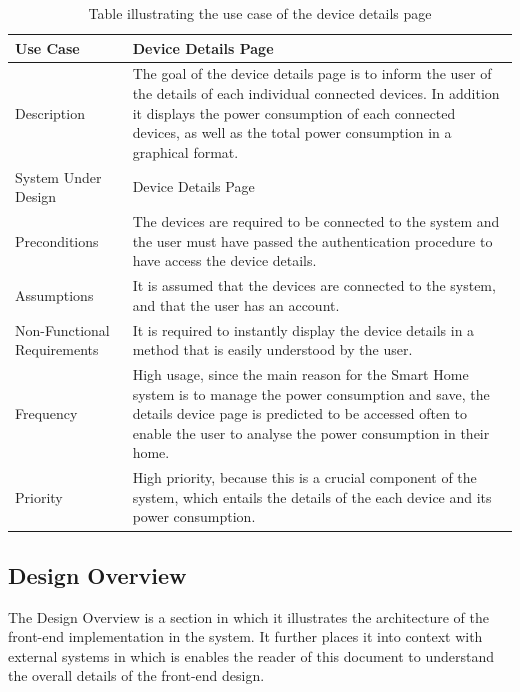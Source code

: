 \documentclass[10pt,twocolumn]{witseiepaper}
\begin{document}
	\begin{table}[H]
		\centering
		\caption{Table illustrating the use case of the device details page}
		\label{device_details_use_case}
		\begin{tabular}{| p{22mm} | p{50mm} |}
			\hline
			\textbf{Use Case} & \textbf{Device Details Page}\\
			\hline
			Description & The goal of the device details page is to inform the user of the details of each individual connected devices. In addition it displays the power consumption of each connected devices, as well as the total power consumption in a graphical format.\\
			\hline
			System Under Design & Device Details Page \\
			\hline
			Preconditions & The devices are required to be connected to the system and the user must have passed the authentication procedure to have access the device details. \\
			\hline
			Assumptions & It is assumed that the devices are connected to the system, and that the user has an account. \\
			\hline
			Non-Functional Requirements & It is required to instantly display the device details in a method that is easily understood by the user.\\
			\hline
			Frequency & High usage, since the main reason for the Smart Home system is to manage the power consumption and save, the details device page is predicted to be accessed often to enable the user to analyse the power consumption in their home.\\
			\hline
			Priority & High priority, because this is a crucial component of the system, which entails the details of the each device and its power consumption.\\
			\hline
		\end{tabular}
	\end{table}
	\newpage
	\subsection{Design Overview}
	The Design Overview is a section in which it illustrates the architecture of the front-end implementation in the system. It further places it into context with external systems in which is enables the reader of this document to understand the overall details of the front-end design.
	
\end{document}
